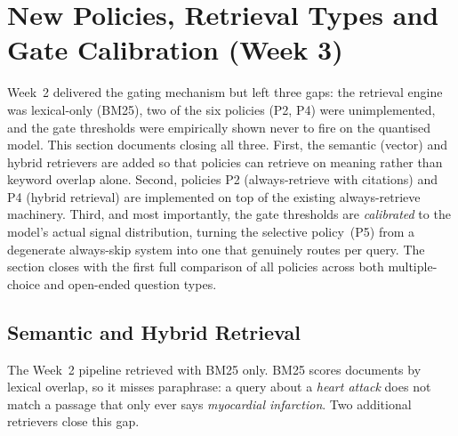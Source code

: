 %

\section{New Policies, Retrieval Types and Gate Calibration (Week 3)}
\label{sec:impl-week3}

Week~2 delivered the gating mechanism but left three gaps: the retrieval engine
was lexical-only (BM25), two of the six policies (P2, P4) were unimplemented, and
the gate thresholds were empirically shown never to fire on the quantised model.
This section documents closing all three. First, the semantic (vector) and hybrid
retrievers are added so that policies can retrieve on meaning rather than keyword
overlap alone. Second, policies P2 (always-retrieve with citations) and P4 (hybrid
retrieval) are implemented on top of the existing always-retrieve machinery.
Third, and most importantly, the gate thresholds are \emph{calibrated} to the
model's actual signal distribution, turning the selective policy~(P5) from a
degenerate always-skip system into one that genuinely routes per query. The
section closes with the first full comparison of all policies across both
multiple-choice and open-ended question types.

\subsection{Semantic and Hybrid Retrieval}
\label{sec:retrieval-types}

The Week~2 pipeline retrieved with BM25 only. BM25 scores documents by lexical
overlap, so it misses paraphrase: a query about a \emph{heart attack} does not
match a passage that only ever says \emph{myocardial infarction}. Two additional
retrievers close this gap.

